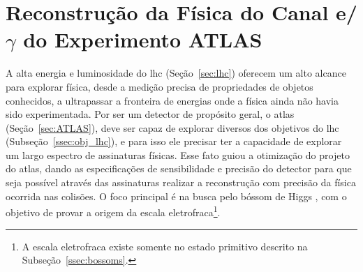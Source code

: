 \chapter[Reconstrução da Física do Canal eGamma do Experimento ATLAS]
{Reconstrução da Física do Canal e/$\gamma$ do Experimento ATLAS}
\label{cap:reco}


A alta energia e luminosidade do \gls{lhc} (Seção~\ref{sec:lhc}) oferecem um alto alcance para
explorar física, desde a medição precisa de propriedades de objetos conhecidos, a
ultrapassar a fronteira de energias onde a física ainda não havia sido experimentada.
Por ser um detector de propósito geral, o \gls{atlas} (Seção~\ref{sec:ATLAS}), deve ser capaz de
explorar diversos dos objetivos do \gls{lhc} (Subseção~\ref{ssec:obj_lhc}), e
para isso ele precisar ter a capacidade de explorar um largo espectro de assinaturas
físicas. Esse fato guiou a otimização do projeto do \gls{atlas}, dando as especificações de sensibilidade e precisão do
detector para que seja possível através das assinaturas realizar a reconstrução
com precisão da física ocorrida nas colisões. O foco principal é na busca pelo
bóssom de Higgs \cite{ATLAS_TDR2}, com o objetivo de provar a origem da escala
eletrofraca\footnote{A escala eletrofraca existe somente no estado primitivo descrito na
Subseção~\ref{ssec:bossoms}.}. 

